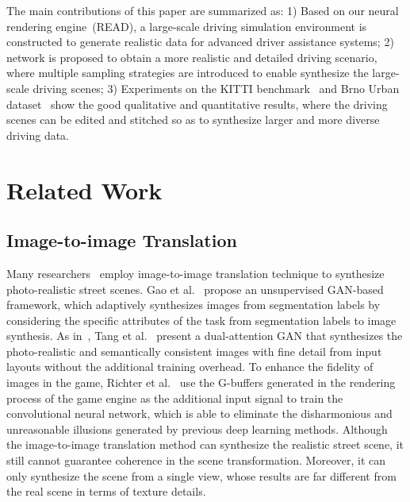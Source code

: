\documentclass[sigconf]{acmart}
\begin{document}
The main contributions of this paper are summarized as: 1) Based on our neural rendering engine~(READ), a large-scale driving simulation environment is constructed to generate realistic data for advanced driver assistance systems; 2)  network is proposed to obtain a more realistic and detailed driving scenario, where multiple sampling strategies are introduced to enable synthesize the large-scale driving scenes; 3) Experiments on the KITTI benchmark~\cite{geiger2012we} and Brno Urban dataset~\cite{ligocki2020brno} show the good qualitative and quantitative results, where the driving scenes can be edited and stitched so as to synthesize larger and more diverse driving data.





\section{Related Work}
\subsection{Image-to-image Translation}
Many researchers~\cite{gao2020lab2pix,tang2020dual,isola2017image,tang2020local,richter2021enhancing} employ image-to-image translation technique to synthesize photo-realistic street scenes. Gao et al.~\cite{gao2020lab2pix} propose an unsupervised GAN-based framework, which adaptively synthesizes images from segmentation labels by considering the specific attributes of the task from segmentation labels to image synthesis. As in~\cite{gao2020lab2pix}, Tang et al.~\cite{tang2020dual} present a dual-attention GAN that synthesizes the photo-realistic and semantically consistent images with fine detail from input layouts without the additional training overhead. To enhance the fidelity of images in the game, Richter et al.~\cite{richter2021enhancing} use the G-buffers generated in the rendering process of the game engine as the additional input signal to train the convolutional neural network, which is able to eliminate the disharmonious and unreasonable illusions generated by previous deep learning methods. Although the image-to-image translation method can synthesize the realistic street scene, it still cannot guarantee coherence in the scene transformation. Moreover, it can only synthesize the scene from a single view, whose results are far different from the real scene in terms of texture details.
\end{document}
